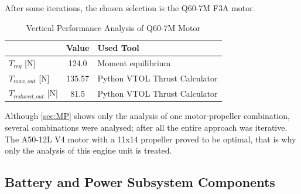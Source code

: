 {After some iterations, the chosen selection is the Q60-7M F3A motor.

\begin{table}[H]
\centering
\caption{Vertical Performance Analysis of Q60-7M Motor}
\label{tab:vert_Q60-7M}
    \begin{tabular}{lcl}
    \toprule
                 &\bfseries Value &\bfseries Used Tool                     \\ \midrule
    $T_{req}$ {[}N{]} & 124.0  & Moment equilibrium            \\\hdashline
    $T_{max,out}$ {[}N{]} & 135.57  & Python VTOL Thrust Calculator           \\\hdashline
    $T_{reduced,out}$ {[}N{]} & 81.5  & Python VTOL Thrust Calculator \\ \bottomrule
    \end{tabular}
\end{table}


Although \autoref{sec:MP} shows only the analysis of one motor-propeller combination, several combinations were analysed; after all the entire approach was iterative. The A50-12L V4 motor with a 11x14 propeller proved to be optimal, that is why only the analysis of this engine unit is treated.

\subsection{Battery and Power Subsystem Components}

}
